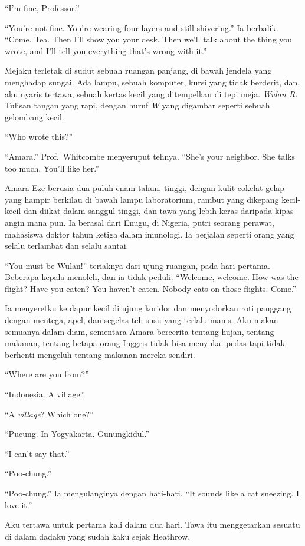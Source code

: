\documentclass[11pt,twoside,openany]{book}
\makeatletter
\newcommand{\scenebreak}{\par\vspace{0.9em}{\centering\textsc{*\hspace{0.7em}*\hspace{0.7em}*}\par}\vspace{0.9em}\@afterindentfalse\@afterheading}
\makeatother
\begin{document}
``I'm fine, Professor.''

``You're not fine. You're wearing four layers and still shivering.'' Ia berbalik. ``Come. Tea. Then I'll show you your desk. Then we'll talk about the thing you wrote, and I'll tell you everything that's wrong with it.''

Mejaku terletak di sudut sebuah ruangan panjang, di bawah jendela yang menghadap sungai. Ada lampu, sebuah komputer, kursi yang tidak berderit, dan, aku nyaris tertawa, sebuah kertas kecil yang ditempelkan di tepi meja. \emph{Wulan R.} Tulisan tangan yang rapi, dengan huruf \emph{W} yang digambar seperti sebuah gelombang kecil.

``Who wrote this?''

``Amara.'' Prof.~Whitcombe menyeruput tehnya. ``She's your neighbor. She talks too much. You'll like her.''

\scenebreak
Amara Eze berusia dua puluh enam tahun, tinggi, dengan kulit cokelat gelap yang hampir berkilau di bawah lampu laboratorium, rambut yang dikepang kecil-kecil dan diikat dalam sanggul tinggi, dan tawa yang lebih keras daripada kipas angin mana pun. Ia berasal dari Enugu, di Nigeria, putri seorang perawat, mahasiswa doktor tahun ketiga dalam imunologi. Ia berjalan seperti orang yang selalu terlambat dan selalu santai.

``You must be Wulan!'' teriaknya dari ujung ruangan, pada hari pertama. Beberapa kepala menoleh, dan ia tidak peduli. ``Welcome, welcome. How was the flight? Have you eaten? You haven't eaten. Nobody eats on those flights. Come.''

Ia menyeretku ke dapur kecil di ujung koridor dan menyodorkan roti panggang dengan mentega, apel, dan segelas teh susu yang terlalu manis. Aku makan semuanya dalam diam, sementara Amara bercerita tentang hujan, tentang makanan, tentang betapa orang Inggris tidak bisa menyukai pedas tapi tidak berhenti mengeluh tentang makanan mereka sendiri.

``Where are you from?''

``Indonesia. A village.''

``A \emph{village}? Which one?''

``Pucung. In Yogyakarta. Gunungkidul.''

``I can't say that.''

``Poo-chung.''

``Poo-chung.'' Ia mengulanginya dengan hati-hati. ``It sounds like a cat sneezing. I love it.''

Aku tertawa untuk pertama kali dalam dua hari. Tawa itu menggetarkan sesuatu di dalam dadaku yang sudah kaku sejak Heathrow.
\end{document}
